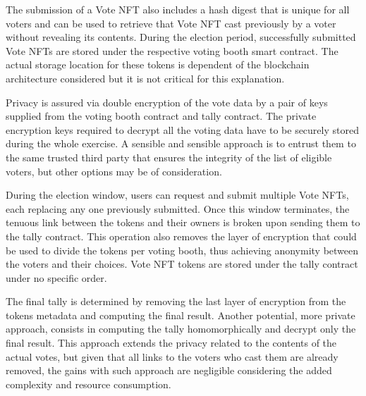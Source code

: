 \documentclass[../main.tex]{subfiles}
\begin{document}
        \par
        The submission of a Vote NFT also includes a hash digest that is unique for all voters and can be used to retrieve that Vote NFT cast previously by a voter without revealing its contents. During the election period, successfully submitted Vote NFTs are stored under the respective voting booth smart contract. The actual storage location for these tokens is dependent of the blockchain architecture considered but it is not critical for this explanation.
        \par
        Privacy is assured via double encryption of the vote data by a pair of keys supplied from the voting booth contract and tally contract. The private encryption keys required to decrypt all the voting data have to be securely stored during the whole exercise. A sensible and sensible approach is to entrust them to the same trusted third party that ensures the integrity of the list of eligible voters, but other options may be of consideration.
        \par
        During the election window, users can request and submit multiple Vote NFTs, each replacing any one previously submitted. Once this window terminates, the tenuous link between the tokens and their owners is broken upon sending them to the tally contract. This operation also removes the layer of encryption that could be used to divide the tokens per voting booth, thus achieving anonymity between the voters and their choices. Vote NFT tokens are stored under the tally contract under no specific order.
        \par
        The final tally is determined by removing the last layer of encryption from the tokens metadata and computing the final result. Another potential, more private approach, consists in computing the tally homomorphically and decrypt only the final result. This approach extends the privacy related to the contents of the actual votes, but given that all links to the voters who cast them are already removed, the gains with such approach are negligible considering the added complexity and resource consumption.
\end{document}
